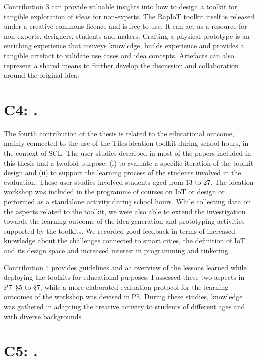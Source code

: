 Contribution 3 can provide valuable insights into how to design a toolkit for tangible exploration of ideas for non-experts. The RapIoT toolkit itself is released under a creative commons licence and is free to use. It can act as a resource for non-experts, designers, students and makers. Crafting a physical prototype is an enriching experience that conveys knowledge, builds experience and provides a tangible artefact to validate use cases and idea concepts. Artefacts can also represent a shared means to further develop the discussion and collaboration around the original idea.


\section[C4: \Civ][Contribution 4]{C4: \Civ.}
\label{c4}

The fourth contribution of the thesis is related to the educational outcome, mainly connected to the use of the Tiles ideation toolkit during school hours, in the context of SCL. The user studies described in most of the papers included in this thesis had a twofold purpose: (i) to evaluate a specific iteration of the toolkit design and (ii) to support the learning process of the students involved in the evaluation. These user studies involved students aged from 13 to 27. The ideation workshop was included in the programme of courses on IoT or design or performed as a standalone activity during school hours.
While collecting data on the aspects related to the toolkit, we were also able to extend the investigation towards the learning outcome of the idea generation and prototyping activities supported by the toolkits. We recorded good feedback in terms of increased knowledge about the challenges connected to smart cities, the definition of IoT and its design space and increased interest in programming and tinkering.

Contribution 4 provides guidelines and an overview of the lessons learned while deploying the toolkits for educational purposes. I assessed these two aspects in P7~\S5 to \S7, while a more elaborated evaluation protocol for the learning outcomes of the workshop was devised in P5.
During these studies, knowledge was gathered in adapting the creative activity to students of different ages and with diverse backgrounds.


\section[C5: \Cv][Contribution 5]{C5: \Cv.}
\label{c5}

